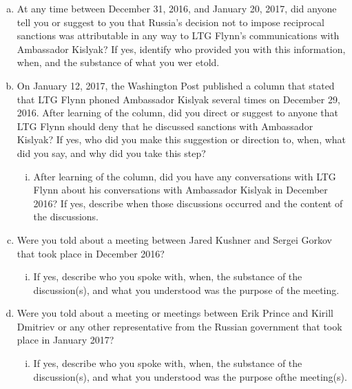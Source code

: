 \begin{enumerate}[a.]
\begin{enumerate}[i.]
\end{enumerate}

\item At any time between December 31, 2016, and January 20, 2017, did anyone tell you or suggest to you that Russia’s decision not to impose reciprocal sanctions was attributable in any way to LTG Flynn’s communications with Ambassador Kislyak?
If yes, identify who provided you with this information, when, and the substance of what you wer etold.

\item On January 12, 2017, the Washington Post published a column that stated that LTG Flynn phoned Ambassador Kislyak several times on December 29, 2016.
After learning of the column, did you direct or suggest to anyone that LTG Flynn should deny that he discussed sanctions with Ambassador Kislyak?
If yes, who did you make this suggestion or direction to, when, what did you say, and why did you take this step?

\begin{enumerate}[i.]

\item After learning of the column, did you have any conversations with LTG Flynn about his conversations with Ambassador Kislyak in December 2016?
If yes, describe when those discussions occurred and the content of the discussions.

\end{enumerate}

\item Were you told about a meeting between Jared Kushner and Sergei Gorkov that took place in December 2016?

\begin{enumerate}[i.]

\item If yes, describe who you spoke with, when, the substance of the discussion(s), and what you understood was the purpose of the meeting.

\end{enumerate}

\item Were you told about a meeting or meetings between Erik Prince and Kirill Dmitriev or any other representative from the Russian government that took place in January 2017?

\begin{enumerate}[i.]

\item If yes, describe who you spoke with, when, the substance of the discussion(s), and what you understood was the purpose ofthe meeting(s).


\end{enumerate}
\end{enumerate}
